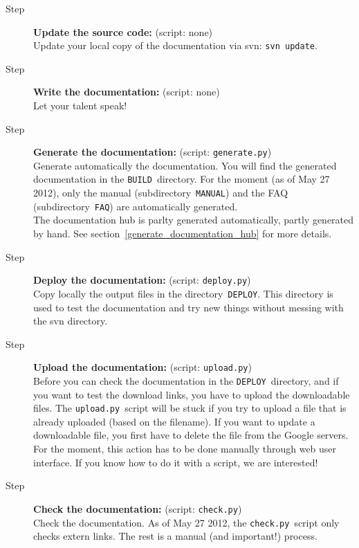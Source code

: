 \documentclass[a4paper,10pt]{article}
\newcommand{\code}[1]{\texttt{#1}}
\begin{document}
\begin{description}
 \item[Step ] {\bf Update the source code:} (script: none)\\Update your local copy of the documentation via svn: \code{svn update}.
 \item[Step ] {\bf Write the documentation:} (script: none)\\Let your talent speak!
 \item[Step ] {\bf Generate the documentation:} (script: \code{generate.py})\\Generate automatically the documentation. You will find the generated documentation
in the \code{BUILD}~directory. For the moment (as of May 27 2012), only the manual (subdirectory~\code{MANUAL}) and the FAQ (subdirectory~\code{FAQ}) are automatically generated.\\
The documentation hub is parlty generated automatically, partly generated by hand. See section~\ref{generate_documentation_hub} for more details. 
 \item[Step ] {\bf Deploy the documentation:} (script: \code{deploy.py})\\Copy locally the output files in the directory~\code{DEPLOY}. This directory is used to test
the documentation and try new things without messing with the svn directory.
\item[Step ] {\bf Upload the documentation:} (script: \code{upload.py})\\Before you can check the documentation in the \code{DEPLOY}~directory, and if you want to test the download links, you have to upload the downloadable files. The \code{upload.py}~script will be stuck if you try to upload a file that is already uploaded (based on the filename). If you want to update a downloadable file, you first have to delete the file from the Google servers. For the moment, this action has to be done manually through web user interface. If you know how to do it with a script, we are interested!
 \item[Step ] {\bf Check the documentation:} (script: \code{check.py})\\Check the documentation. As of May 27 2012, the \code{check.py}~script only checks extern links. The rest is a manual (and important!) process.

\end{description}
\end{document}
